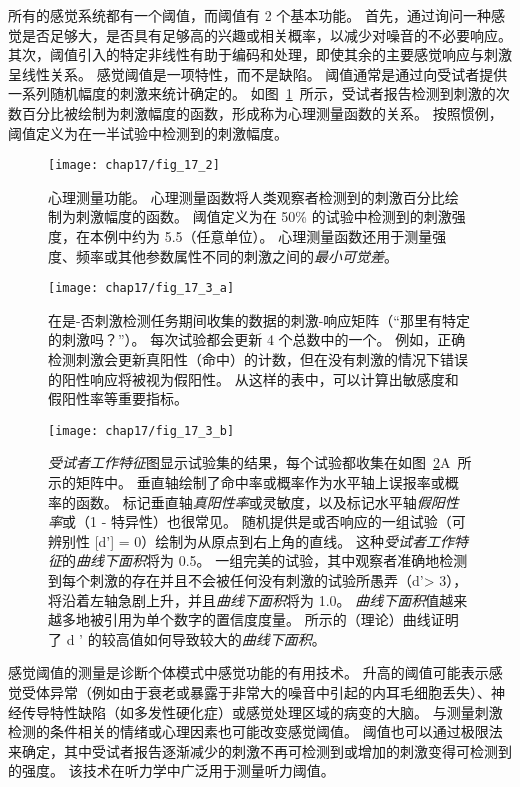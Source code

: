 所有的感觉系统都有一个阈值，而阈值有 2 个基本功能。
首先，通过询问一种感觉是否足够大，是否具有足够高的兴趣或相关概率，以减少对噪音的不必要响应。
其次，阈值引入的特定非线性有助于编码和处理，即使其余的主要感觉响应与刺激呈线性关系。
感觉阈值是一项特性，而不是缺陷。 
阈值通常是通过向受试者提供一系列随机幅度的刺激来统计确定的。
如图~\ref{fig:17_2}~所示，受试者报告检测到刺激的次数百分比被绘制为刺激幅度的函数，形成称为心理测量函数的关系。
按照惯例，阈值定义为在一半试验中检测到的刺激幅度。


\begin{figure}[htbp]
	\centering
	\texttt{[image: chap17/fig\_17\_2]}
	\caption{心理测量功能。
		心理测量函数将人类观察者检测到的刺激百分比绘制为刺激幅度的函数。 
		阈值定义为在 50\% 的试验中检测到的刺激强度，在本例中约为 5.5（任意单位）。 
		心理测量函数还用于测量强度、频率或其他参数属性不同的刺激之间的\textit{最小可觉差}。}
	\label{fig:17_2}
\end{figure}


\begin{figure}[htbp]
	\centering
	\texttt{[image: chap17/fig\_17\_3\_a]}
	\caption{在是-否刺激检测任务期间收集的数据的刺激-响应矩阵（“那里有特定的刺激吗？”）。
		每次试验都会更新 4 个总数中的一个。
		例如，正确检测刺激会更新真阳性（命中）的计数，但在没有刺激的情况下错误的阳性响应将被视为假阳性。
		从这样的表中，可以计算出敏感度和假阳性率等重要指标。}
	\label{fig:17_3_a}
\end{figure}


\begin{figure}[htbp]
	\centering
	\texttt{[image: chap17/fig\_17\_3\_b]}
	\caption{\textit{受试者工作特征}图显示试验集的结果，每个试验都收集在如图~\ref{fig:17_3_a}A~所示的矩阵中。
		垂直轴绘制了命中率或概率作为水平轴上误报率或概率的函数。
		标记垂直轴\textit{真阳性率}或灵敏度，以及标记水平轴\textit{假阳性率}或（1 - 特异性）也很常见。
		随机提供是或否响应的一组试验（可辨别性 [d'] = 0）绘制为从原点到右上角的直线。
		这种\textit{受试者工作特征}的\textit{曲线下面积}将为 0.5。
		一组完美的试验，其中观察者准确地检测到每个刺激的存在并且不会被任何没有刺激的试验所愚弄（d'> 3），将沿着左轴急剧上升，并且\textit{曲线下面积}将为 1.0。
		\textit{曲线下面积}值越来越多地被引用为单个数字的置信度度量。
		所示的（理论）曲线证明了 d ' 的较高值如何导致较大的\textit{曲线下面积}\cite{swets1973relative}。}
	\label{fig:17_3_b}
\end{figure}


感觉阈值的测量是诊断个体模式中感觉功能的有用技术。 
升高的阈值可能表示感觉受体异常（例如由于衰老或暴露于非常大的噪音中引起的内耳毛细胞丢失）、神经传导特性缺陷（如多发性硬化症）或感觉处理区域的病变的大脑。
与测量刺激检测的条件相关的情绪或心理因素也可能改变感觉阈值。
阈值也可以通过极限法来确定，其中受试者报告逐渐减少的刺激不再可检测到或增加的刺激变得可检测到的强度。
该技术在听力学中广泛用于测量听力阈值。


